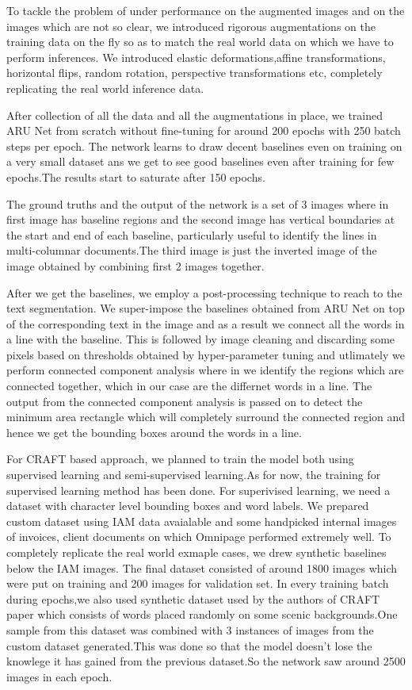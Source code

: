 To tackle the problem of under performance on the augmented images and on the images which are not so clear, we introduced rigorous augmentations on the training data on the fly so as to match the real world data on which we have to perform inferences. We introduced elastic deformations,affine transformations, horizontal flips, random rotation, perspective transformations etc, completely replicating the real world inference data.

After collection of all the data and all the augmentations in place, we trained ARU Net from scratch without fine-tuning for around 200 epochs with 250 batch steps per epoch. The network learns to draw decent baselines even on training on a very small dataset ans we get to see good baselines even after training for few epochs.The results start to saturate after 150 epochs.

The ground truths and the output of the network is a set of 3 images where in first image has baseline regions and the second image has vertical boundaries at the start and end of each baseline, particularly useful to identify the lines in multi-columnar documents.The third image is just the inverted image of the image obtained by combining first 2 images together.

After we get the baselines, we employ a post-processing technique to reach to the text segmentation. We super-impose the baselines obtained from ARU Net on top of the corresponding text in the image and as a result we connect all the words in a line with the baseline. This is followed by image cleaning and discarding some pixels based on thresholds obtained by hyper-parameter tuning and utlimately we perform connected component analysis where in we identify the regions which are connected together, which in our case are the differnet words in a line. The output from the connected component analysis is passed on to detect the minimum area rectangle which will completely surround the connected region and hence we get the bounding boxes around the words in a line.

For CRAFT based approach, we planned to train the model both using supervised learning and semi-supervised learning.As for now, the training for supervised learning method has been done. For superivised learning, we need a dataset with character level bounding boxes and word labels. We prepared custom dataset using IAM data avaialable and some handpicked internal images of invoices, client documents on which Omnipage performed extremely well. To completely replicate the real world exmaple cases, we drew synthetic baselines below the IAM images. The final dataset consisted of around 1800 images which were put on training and 200 images for validation set.
In every training batch during epochs,we also used synthetic dataset used by the authors of CRAFT paper which consists of words placed randomly on some scenic backgrounds.One sample from this dataset was combined with 3 instances of images from the custom dataset generated.This was done so that the model doesn't lose the knowlege it has gained from the previous dataset.So the network saw around 2500 images in each epoch.

